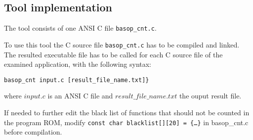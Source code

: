 \subsection{Tool implementation}
The tool consists of one ANSI C file {\tt basop\_cnt.c}.

To use this tool the C source file {\tt basop\_cnt.c} has to be
compiled and linked. The resulted executable file has to be called for
each C source file of the examined application, with the following
syntax:
\begin{verbatim}
basop_cnt input.c [result_file_name.txt]}
\end{verbatim}
where $input.c$ is an ANSI C file and $result\_file\_name.txt$ the
ouput result file.

If needed to further edit the black list of functions that should not
be counted in the program ROM, modify {\tt const char blacklist[][20]
= \{{\dots}\}} in basop\_cnt.c before compilation.


